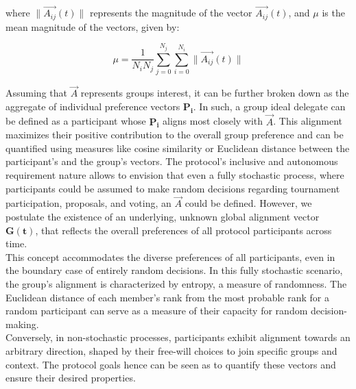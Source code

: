\documentclass{article}
\begin{document}
\begin{CJK}{UTF8}{gbsn}
\begin{multicols}{2}
            where $\|\vec{A_{ij}}(t)\|$ represents the magnitude of the vector $\vec{A_{ij}}(t)$, and $\mu$ is the mean magnitude of the vectors, given by:

            \begin{equation}
            \mu = \frac{1}{N_{i}N_{j}} \sum_{j=0}^{N_{j}} \sum_{i=0}^{N_{i}} \|\vec{A_{ij}}(t)\|
            \end{equation}

        Assuming that $\vec{A}$ represents groups interest, it can be further broken down as the aggregate of individual preference vectors $\mathbf{P_i}$. In such, a group ideal delegate can be defined as a participant whose $\mathbf{P_i}$ aligns most closely with $\vec{A}$.
        This alignment maximizes their positive contribution to the overall group preference and can be quantified using measures like cosine similarity or Euclidean distance between the participant's and the group's vectors.
        The protocol's inclusive and autonomous requirement nature allows to envision that even a fully stochastic process, where participants could be assumed to make random decisions regarding tournament participation, proposals, and voting, an $\vec{A}$ could be defined.
        However, we postulate the existence of an underlying, unknown global alignment vector $\mathbf{G(t)}$, that reflects the overall preferences of all protocol participants across time. \\
        This concept accommodates the diverse preferences of all participants, even in the boundary case of entirely random decisions.
        In this fully stochastic scenario, the group's alignment is characterized by entropy, a measure of randomness. The Euclidean distance of each member's rank from the most probable rank for a random participant can serve as a measure of their capacity for random decision-making. \\
        Conversely, in non-stochastic processes, participants exhibit alignment towards an arbitrary direction, shaped by their free-will choices to join specific groups and context. The protocol goals hence can be seen as to quantify these vectors and ensure their desired properties.



\end{multicols}
\end{CJK}
\end{document}
